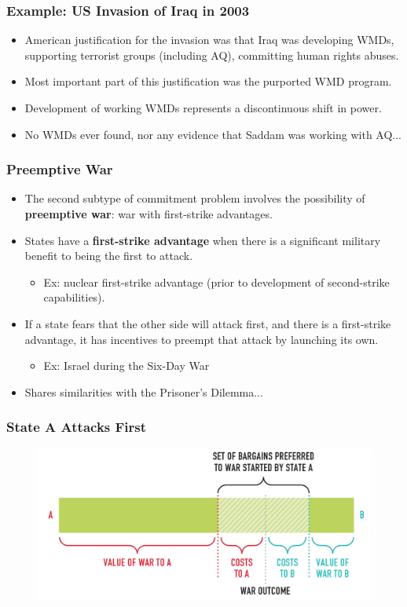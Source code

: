 \documentclass{beamer}
\begin{document}
\begin{frame} 
	\frametitle{\LARGE{Example: US Invasion of Iraq in 2003}}
	\begin{itemize}
		\item American justification for the invasion was that Iraq was developing WMDs, supporting terrorist groups (including AQ), committing human rights abuses. \pause
		\item Most important part of this justification was the purported WMD program. \pause
		\item Development of working WMDs represents a discontinuous shift in power. \pause
		\item No WMDs ever found, nor any evidence that Saddam was working with AQ...
	\end{itemize}
\end{frame}


\begin{frame} 
	\frametitle{\LARGE{Preemptive War}}
	\begin{itemize}
		\item The second subtype of commitment problem involves the possibility of \textbf{preemptive war}: war with first-strike advantages. \pause
		\item States have a \textbf{first-strike advantage} when there is a significant military benefit to being the first to attack. \pause
		\begin{itemize}
			\item Ex: nuclear first-strike advantage (prior to development of second-strike capabilities).
		\end{itemize}
		\item If a state fears that the other side will attack first, and there is a first-strike advantage, it has incentives to preempt that attack by launching its own. \pause 
		\begin{itemize}
			\item Ex: Israel during the Six-Day War
		\end{itemize}
		\item Shares similarities with the Prisoner's Dilemma...
	\end{itemize}
\end{frame}

\begin{frame} 
	\frametitle{\LARGE{State A Attacks First}}
	\begin{figure}[ht!]
		\centering
		\includegraphics[width=\textwidth,height=0.8\textheight,keepaspectratio]{./stateafirst.png}
	\end{figure}
\end{frame}
\end{document}
